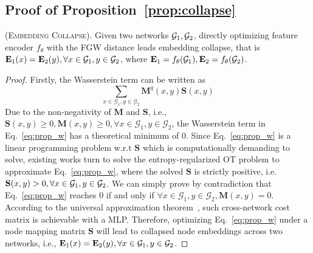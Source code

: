 \subsection{Proof of Proposition~\ref{prop:collapse}}
\begin{proposition*}
{\normalfont\textsc{(Embedding Collapse).}}
Given two networks $\mathcal{G}_1,\mathcal{G}_2$, directly optimizing feature encoder $f_\theta$ with the FGW distance leads embedding collapse, that is $\mathbf{E}_1(x)=\mathbf{E}_2(y), \forall x\in\mathcal{G}_1,y\in\mathcal{G}_2$, where $\mathbf{E}_1=f_\theta(\mathcal{G}_1),\mathbf{E}_2=f_\theta(\mathcal{G}_2)$.
\end{proposition*}
\begin{proof}
Firstly, the Wasserstein term can be written as
\begin{equation}
    \sum_{x\in\mathcal{G}_1,y\in\mathcal{G}_2}\mathbf{M}^q(x, y)\mathbf{S}(x,y)
\label{eq:prop_w}
\end{equation}
Due to the non-negativity of $\mathbf{M}$ and $\mathbf{S}$, i.e., $\mathbf{S}(x,y)\geq 0, \mathbf{M}(x, y)\geq 0, \forall x\in\mathcal{G}_1, y\in\mathcal{G}_2$, the Wasserstein term in Eq.~\eqref{eq:prop_w} has a theoretical minimum of 0.
Since Eq.~\eqref{eq:prop_w} is a linear programming problem w.r.t $\mathbf{S}$ which is computationally demanding to solve, existing works turn to solve the entropy-regularized OT problem to approximate Eq.~\eqref{eq:prop_w}, where the solved $\mathbf{S}$ is strictly positive, i.e. $\mathbf{S}(x,y)>0,\forall x\in\mathcal{G}_1,y\in\mathcal{G}_2$.
We can simply prove by contradiction that Eq.~\eqref{eq:prop_w} reaches 0 if and only if $ \forall x\in\mathcal{G}_1, y\in\mathcal{G}_2, \mathbf{M}(x, y)=0$. According to the universal approximation theorem~\cite{cybenko1989approximation}, such cross-network cost matrix is achievable with a MLP. Therefore, optimizing Eq.~\eqref{eq:prop_w} under a node mapping matrix $\mathbf{S}$ will lead to collapsed node embeddings across two networks, i.e., $\mathbf{E}_1(x)=\mathbf{E}_2(y), \forall x\in\mathcal{G}_1,y\in\mathcal{G}_2$.


\end{proof}
